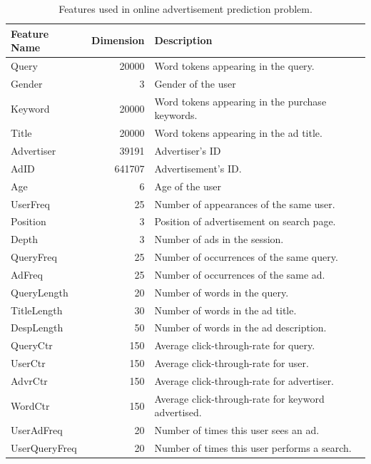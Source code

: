 \documentclass[11pt,twoside]{article}
\theoremstyle{definition}
\begin{document}
\begin{table}[t]
  \centering
  \caption{Features used in online advertisement prediction problem.}
  \label{tab:feature}
  \begin{tabular}{|l|r|l|}\hline
    Feature Name & Dimension & Description \\
    \hline
    Query & 20000 & Word tokens appearing in the query. \\
    \hline
    Gender & 3 & Gender of the user\\\hline
    Keyword & 20000 & Word tokens appearing in the purchase keywords.\\\hline
    Title & 20000 & Word tokens appearing in the ad title.\\\hline
    Advertiser & 39191 & Advertiser's ID\\\hline
    AdID & 641707 & Advertisement's ID.\\\hline
    Age & 6 & Age of the user\\\hline
    UserFreq & 25 & Number of appearances of the same user.\\\hline
    Position & 3 & Position of advertisement on search page.\\\hline
    Depth & 3 & Number of ads in the session.\\\hline
    QueryFreq & 25 & Number of occurrences of the same query.\\\hline
    AdFreq & 25 &Number of occurrences of the same ad.\\\hline
    QueryLength & 20 & Number of words in the query.\\\hline
    TitleLength & 30 & Number of words in the ad title.\\\hline
    DespLength & 50 & Number of words in the ad description.\\\hline
    QueryCtr & 150 & Average click-through-rate for query.\\\hline
    UserCtr & 150 & Average click-through-rate for user.\\\hline
    AdvrCtr & 150 &Average click-through-rate for advertiser.\\\hline
    WordCtr & 150 & Average click-through-rate for keyword advertised.\\\hline
    UserAdFreq & 20 & Number of times this user sees an ad.\\\hline
    UserQueryFreq & 20 & Number of times this user performs a search.\\\hline
  \end{tabular}
\end{table}
\end{document}
